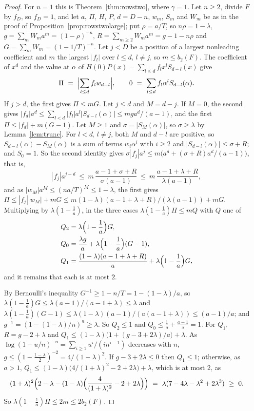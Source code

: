 \documentclass[11pt]{article}
\begin{document}
\begin{proof}
For $n=1$ this is Theorem~\ref{thm:rowstwo}, where $\gamma=1$.  Let
$n\ge2$, divide $F$ by $f_D$, so $f_D=1$, and let $a$, $\Pi$, $H$, $P$,
$d=D-n$, $w_m$, $S_m$ and $W_m$ be as in the proof of
Proposition~\ref{prop:rowstwolarge}; put $\rho=a/T$, so $n\rho=1-\lambda$,
$g=\sum_mW_ma^m=(1-\rho)^{-n}$, $R=\sum_{m\ge2}W_ma^m=g-1-n\rho$ and
$G=\sum_mW_m=(1-1/T)^{-n}$.  Let $j<D$ be a position of a largest
nonleading coefficient and $m$ the largest $|f_l|$ over $l\le d$, $l\ne j$,
so $m\le b_2(F)$.  The coefficient of $x^d$ and the value at $\alpha$ of
$H(0)P(x)=\sum_{l\le d}f_lx^lS_{d-l}(x)$ give
\[
  \Pi\ =\ \Bigl|\sum_{l\le d}f_lw_{d-l}\Bigr|,\qquad
  0\ =\ \sum_{l\le d}f_l\alpha^lS_{d-l}(\alpha).
\]
If $j>d$, the first gives $\Pi\le mG$.  Let $j\le d$ and $M=d-j$.  If
$M=0$, the second gives
$|f_d|a^d\le\sum_{l<d}|f_l|a^l|S_{d-l}(\alpha)|\le mga^d/(a-1)$, and the
first $\Pi\le|f_d|+m(G-1)$.  Let $M\ge1$ and $\sigma=|S_M(\alpha)|$, so
$\sigma\ge\lambda$ by Lemma~\ref{lem:trunc}.  For $l<d$, $l\ne j$, both $M$
and $d-l$ are positive, so $S_{d-l}(\alpha)-S_M(\alpha)$ is a sum of terms
$w_i\alpha^i$ with $i\ge2$ and $|S_{d-l}(\alpha)|\le\sigma+R$; and
$S_0=1$.  So the second identity gives
$\sigma|f_j|a^j\le m\bigl(a^d+(\sigma+R)a^d/(a-1)\bigr)$, that is,
\[
  |f_j|a^{j-d}\ \le\ m\,\frac{a-1+\sigma+R}{\sigma(a-1)}\ \le\ m\,\frac{a-1+\lambda+R}{\lambda(a-1)} ,
\]
and as $|w_M|a^M\le(na/T)^M\le1-\lambda$, the first gives
$\Pi\le|f_j||w_M|+mG\le m(1-\lambda)(a-1+\lambda+R)/(\lambda(a-1))+mG$.
Multiplying by $\lambda(1-\frac1a)$, in the three cases
$\lambda(1-\frac1a)\Pi\le mQ$ with $Q$ one of
\[
  \begin{aligned}
  Q_2&=\lambda\Bigl(1-\frac1a\Bigr)G,\\
  Q_0&=\frac{\lambda g}a+\lambda\Bigl(1-\frac1a\Bigr)(G-1),\\
  Q_1&=\frac{(1-\lambda)(a-1+\lambda+R)}a
       +\lambda\Bigl(1-\frac1a\Bigr)G,
  \end{aligned}
\]
and it remains that each is at most $2$.

By Bernoulli's inequality $G^{-1}\ge1-n/T=1-(1-\lambda)/a$, so
$\lambda(1-\frac1a)G\le\lambda(a-1)/(a-1+\lambda)\le\lambda$ and
$\lambda(1-\frac1a)(G-1)\le\lambda(1-\lambda)(a-1)/(a(a-1+\lambda))\le(a-1)/a$;
and $g^{-1}=(1-(1-\lambda)/n)^n\ge\lambda$.  So $Q_2\le1$ and
$Q_0\le\frac1a+\frac{a-1}a=1$.  For $Q_1$, $R=g-2+\lambda$ and
$Q_1\le(1-\lambda)\bigl(1+(g-3+2\lambda)/a\bigr)+\lambda$.  As
$\log(1-u/n)^{-n}=\sum_{i\ge1}u^i/(in^{i-1})$ decreases with $n$,
$g\le(1-\frac{1-\lambda}2)^{-2}=4/(1+\lambda)^2$.  If $g-3+2\lambda\le0$
then $Q_1\le1$; otherwise, as $a>1$,
$Q_1\le(1-\lambda)\bigl(4/(1+\lambda)^2-2+2\lambda\bigr)+\lambda$, which is
at most $2$, as
\[
  (1+\lambda)^2\Bigl(2-\lambda-(1-\lambda)\Bigl(\frac4{(1+\lambda)^2}-2+2\lambda\Bigr)\Bigr)
  \ =\ \lambda(7-4\lambda-\lambda^2+2\lambda^3)\ \ge\ 0 .
\]
So $\lambda(1-\frac1a)\Pi\le2m\le2b_2(F)$.
\end{proof}
\end{document}
